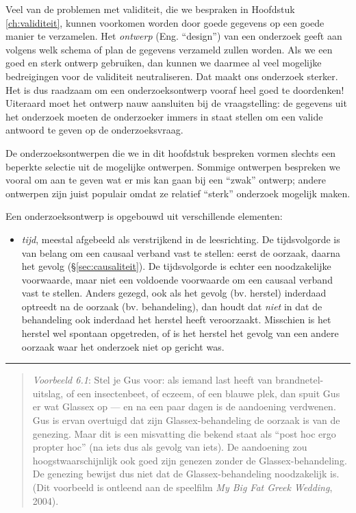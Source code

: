 \documentclass[
]{book}
\providecommand{\tightlist}{%
  \setlength{\itemsep}{0pt}\setlength{\parskip}{0pt}}
\begin{document}
Veel van de problemen met validiteit, die we bespraken in
Hoofdstuk \ref{ch:validiteit}, kunnen voorkomen worden door goede gegevens
op een goede manier te verzamelen. Het \emph{ontwerp} (Eng. ``design'') van een
onderzoek geeft aan volgens welk schema of plan de gegevens verzameld
zullen worden. Als we een goed en sterk ontwerp gebruiken, dan kunnen we
daarmee al veel mogelijke bedreigingen voor de validiteit neutraliseren.
Dat maakt ons onderzoek sterker. Het is dus raadzaam om een
onderzoeksontwerp vooraf heel goed te doordenken! Uiteraard moet het
ontwerp nauw aansluiten bij de vraagstelling: de gegevens uit het
onderzoek moeten de onderzoeker immers in staat stellen om een valide
antwoord te geven op de onderzoeksvraag.

De onderzoeksontwerpen die we in dit hoofdstuk bespreken vormen slechts
een beperkte selectie uit de mogelijke ontwerpen. Sommige ontwerpen
bespreken we vooral om aan te geven wat er mis kan gaan bij een ``zwak''
ontwerp; andere ontwerpen zijn juist populair omdat ze relatief ``sterk''
onderzoek mogelijk maken.

Een onderzoeksontwerp is opgebouwd uit verschillende elementen:

\begin{itemize}
\tightlist
\item
  \emph{tijd}, meestal afgebeeld als verstrijkend in de leesrichting. De
  tijdsvolgorde is van belang om een causaal verband vast te stellen:
  eerst de oorzaak, daarna het gevolg
  (§\ref{sec:causaliteit}). De tijdsvolgorde is echter een
  noodzakelijke voorwaarde, maar niet een voldoende voorwaarde om een
  causaal verband vast te stellen. Anders gezegd, ook als het gevolg
  (bv. herstel) inderdaad optreedt na de oorzaak (bv. behandeling),
  dan houdt dat \emph{niet} in dat de behandeling ook inderdaad het herstel
  heeft veroorzaakt. Misschien is het herstel wel spontaan opgetreden,
  of is het herstel het gevolg van een andere oorzaak waar het
  onderzoek niet op gericht was.
\end{itemize}

\begin{center}\rule{0.5\linewidth}{0.5pt}\end{center}

\begin{quote}
\emph{Voorbeeld 6.1}: Stel je Gus voor: als iemand last heeft van brandnetel-uitslag, of een insectenbeet, of eczeem, of een blauwe plek, dan spuit Gus er wat Glassex op --- en na een paar dagen is de aandoening verdwenen. Gus is ervan overtuigd dat zijn Glassex-behandeling de oorzaak is van de genezing. Maar dit is een misvatting die bekend staat als ``post hoc ergo propter hoc'' (na iets dus als gevolg van iets). De aandoening zou hoogstwaarschijnlijk ook goed zijn genezen zonder de Glassex-behandeling. De genezing bewijst dus niet dat de Glassex-behandeling noodzakelijk is. (Dit voorbeeld is ontleend aan de speelfilm \emph{My Big Fat Greek Wedding}, 2004).
\end{quote}
\end{document}
